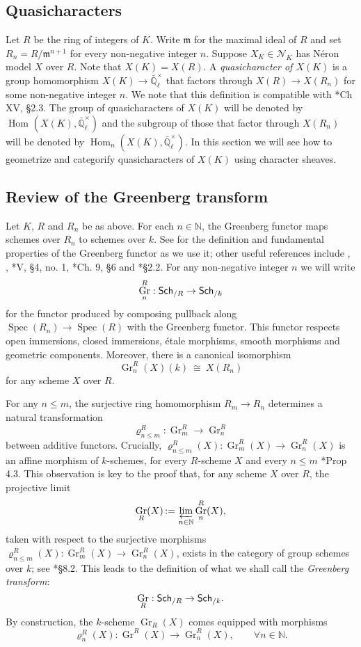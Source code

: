 \documentclass[10pt]{amsart}
\theoremstyle{plain}
\theoremstyle{definition}
\newcommand{\NN}{{\mathbb{N}}}
\newcommand{\EE}{\mathbb{\bar Q}_\ell}
\newcommand{\Fq}{k}
\newcommand{\EEx}{\EE^\times}
\newcommand{\m}{{\mathfrak{m}}}
\DeclareMathOperator{\Hom}{Hom}
\DeclareMathOperator{\Gr}{Gr}
\newcommand{\Spec}[1]{{\operatorname{Spec}(#1)}}
\newcommand{\ceq}{{\, :=\, }}
\newcommand{\iso}{{\ \cong\ }}
\newcommand{\catname}[1]{\normalfont{\textsf{#1}}}
\newcommand{\Sch}[1]{{\catname{Sch}_{/#1}}}
\begin{document}
\subsection{Quasicharacters}\label{ssec:quasicharacters}

Let $R$ be the ring of integers of $K$.
Write $\m$ for the maximal ideal of $R$ and set $R_n = R/\m^{n+1}$ for every non-negative integer $n$.
Suppose $X_K \in \mathcal{N}_K$ has N\'eron model $X$ over $R$.
Note that $X(K) = X(R)$.
A \emph{quasicharacter of $X(K)$} is a group homomorphism $X(K) \to \EEx$ that factors through $X(R) \to X(R_n)$ for some non-negative integer $n$.
We note that this definition is compatible with \cite{cassels-frohlich:AlgebraicNumberTheory}*{Ch XV, \S 2.3}.
The group of quasicharacters of $X(K)$ will be denoted by 
$\Hom_\text{}(X(K),\EEx)$
 and the subgroup of those that factor through $X(R_n)$ will be denoted by $\Hom_n(X(K),\EEx)$.
In this section we will see how to geometrize and categorify quasicharacters of $X(K)$ using character sheaves.

\subsection{Review of the Greenberg transform} \label{ssec:rev_Greenberg}

Let $K$, $R$ and $R_n$ be as above.
For each $n \in \NN$, the Greenberg functor maps schemes over $R_n$ to schemes over $\Fq$.
See \cite{bertrapelle-gonzales:Greenberg} for the definition and fundamental properties of the Greenberg functor as we use it; other useful references include
\cite{greenberg:61}, \cite{greenberg:63a},
\cite{demazure-gabriel:GroupesAlgebriques}*{V, \S 4, no. 1},
\cite{bosch-lutkebohmert-reynaud:NeronModels}*{Ch. 9, \S 6} and
\cite{nicaise-sebag:motivicSerre}*{\S 2.2}. %
%
For any non-negative integer $n$ we will write
\[
\Gr^R_n : \Sch{R} \to \Sch{\Fq}
\]
for the functor produced by composing pullback along $\Spec{R_n} \to \Spec{R}$ with the Greenberg functor. 
This functor respects open immersions, closed immersions, \'etale morphisms, smooth morphisms and geometric components.  Moreover, there is a canonical isomorphism
\[
\Gr^R_n(X)(\Fq) \iso X(R_n)
\]
for any scheme $X$ over $R$.

For any $n\leq m$,  the surjective ring homomorphism $R_{m} \to R_n$ determines a
natural transformation 
\[
\varrho^R_{n\leq m} : \Gr^R_{m} \to \Gr^R_n
\]
between additive functors.
Crucially, $\varrho^R_{n\leq m}(X): \Gr^R_{m}(X)\to \Gr^R_n(X)$ is an affine morphism of $\Fq$-schemes, for every $R$-scheme $X$ and every $n\leq m$ \cite{bertrapelle-gonzales:Greenberg}*{Prop 4.3}.
This observation is key to the proof that, for any scheme $X$ over $R$, the projective limit 
\[
\Gr_R(X) \ceq \varprojlim_{n\in \NN} \Gr^R_n(X),
\]
taken with respect to the surjective morphisms $\varrho^R_{n\leq m}(X) : \Gr^R_{m}(X) \to \Gr^R_n(X)$,
exists in the category of group schemes over $\Fq$;
see \cite{EGAIV3}*{\S 8.2}.
This leads to the definition of what we shall call the {\it Greenberg transform}:
\[
\Gr_R : \Sch{R} \to \Sch{\Fq}.
\]
By construction, the $\Fq$-scheme $\Gr_R(X)$ comes equipped with morphisms 
\[
\varrho^R_n(X) : \Gr^R(X) \to \Gr^R_n(X),\qquad \forall n\in \NN.
\]
\end{document}
